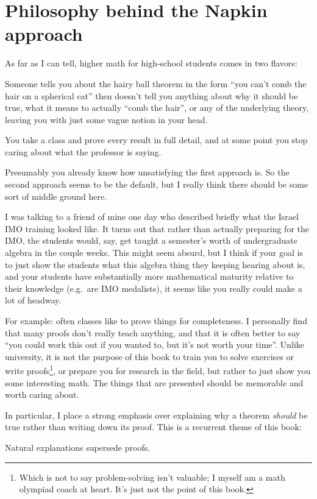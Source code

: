 \section*{Philosophy behind the Napkin approach}
As far as I can tell, higher math for high-school students
comes in two flavors:
\begin{itemize}
	\ii Someone tells you about the hairy ball theorem in the form
	``you can't comb the hair on a spherical cat''
	then doesn't tell you anything about why it should be true,
	what it means to actually ``comb the hair'',
	or any of the underlying theory,
	leaving you with just some vague notion in your head.

	\ii You take a class and prove every result in full detail,
	and at some point you stop caring about what the professor is saying.
\end{itemize}
Presumably you already know how unsatisfying the first approach is.
So the second approach seems to be the default,
but I really think there should be some sort of middle ground here.

I was talking to a friend of mine one day who described briefly
what the Israel IMO training looked like.
It turns out that rather than actually preparing for the IMO,
the students would, say, get taught a semester's worth of
undergraduate algebra in the couple weeks.
This might seem absurd, but I think if your goal is to just show the students
what this algebra thing they keeping hearing about is,
and your students have substantially more mathematical maturity
relative to their knowledge (e.g.\ are IMO medalists),
it seems like you really could make a lot of headway.

For example: often classes like to prove things for completeness.
I personally find that many proofs don't really teach anything,
and that it is often better to say
``you could work this out if you wanted to,
but it's not worth your time''.
Unlike university, it is not the purpose of this book to
train you to solve exercises or write proofs\footnote{Which is
	not to say problem-solving isn't valuable;
	I myself am a math olympiad coach at heart.
	It's just not the point of this book.},
or prepare you for research in the field,
but rather to just show you some interesting math.
The things that are presented should be memorable and worth caring about.

In particular, I place a strong emphasis over explaining
why a theorem \emph{should} be true rather than writing down its proof.
This is a recurrent theme of this book:
\begin{moral}
	Natural explanations supersede proofs.
\end{moral}


